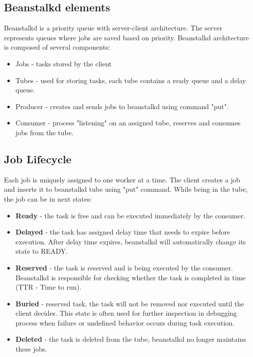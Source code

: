     \subsection{Beanstalkd elements}
    Beanstalkd is a priority queue with server-client architecture. The server represents queues where jobs are saved based on priority. Beanstalkd architecture is composed of several components:
    \begin{itemize}
        \item Jobs - tasks stored by the client
        \item Tubes - used for storing tasks, each tube contains a ready queue and a delay queue.
        \item Producer - creates and sends jobs to beanstalkd using command "put".
        \item Consumer - process "listening" on an assigned tube, reserves and consumes jobs from the tube.
    \end{itemize}

    \subsection{Job Lifecycle}
    Each job is uniquely assigned to one worker at a time. The client creates a job and inserts it to beanstalkd tube using "put" command. While being in the tube, the job can be in next states\cite{beanstalkdProtocol}:
    \begin{itemize}
        \item \textbf{Ready} - the task is free and can be executed immediately by the consumer.
        \item \textbf{Delayed} - the task has assigned delay time that needs to expire before execution. After delay time expires, beanstalkd will automatically change its state to READY.
        \item \textbf{Reserved} - the task is reserved and is being executed by the consumer. Beanstalkd is responsible for checking whether the task is completed in time (TTR - Time to run).
        \item \textbf{Buried} - reserved task, the task will not be removed nor executed until the client decides. This state is often used for further inspection in debugging process when failure or undefined behavior occurs during task execution.
        \item \textbf{Deleted} - the task is deleted from the tube, beanstalkd no longer maintains these jobs.
    \end{itemize}

